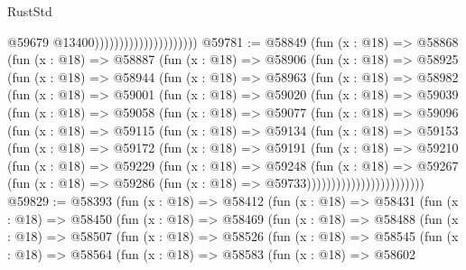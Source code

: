 \begin{lexlean}{RustStd}
\begin{coremodule}
                                              @59679
                                              @13400)))))))))))))))))))))
@59781 := @58849
    (fun (x : @18) =>
    @58868
      (fun (x : @18) =>
      @58887
        (fun (x : @18) =>
        @58906
          (fun (x : @18) =>
          @58925
            (fun (x : @18) =>
            @58944
              (fun (x : @18) =>
              @58963
                (fun (x : @18) =>
                @58982
                  (fun (x : @18) =>
                  @59001
                    (fun (x : @18) =>
                    @59020
                      (fun (x : @18) =>
                      @59039
                        (fun (x : @18) =>
                        @59058
                          (fun (x : @18) =>
                          @59077
                            (fun (x : @18) =>
                            @59096
                              (fun (x : @18) =>
                              @59115
                                (fun (x : @18) =>
                                @59134
                                  (fun (x : @18) =>
                                  @59153
                                    (fun (x : @18) =>
                                    @59172
                                      (fun (x : @18) =>
                                      @59191
                                        (fun (x : @18) =>
                                        @59210
                                          (fun (x : @18) =>
                                          @59229
                                            (fun (x : @18) =>
                                            @59248
                                              (fun (x : @18) =>
                                              @59267
                                                (fun (x : @18) =>
                                                @59286
                                                  (fun (x : @18) => @59733))))))))))))))))))))))))
@59829 := @58393
    (fun (x : @18) =>
    @58412
      (fun (x : @18) =>
      @58431
        (fun (x : @18) =>
        @58450
          (fun (x : @18) =>
          @58469
            (fun (x : @18) =>
            @58488
              (fun (x : @18) =>
              @58507
                (fun (x : @18) =>
                @58526
                  (fun (x : @18) =>
                  @58545
                    (fun (x : @18) =>
                    @58564
                      (fun (x : @18) =>
                      @58583
                        (fun (x : @18) =>
                        @58602

\end{coremodule}
\end{lexlean}
